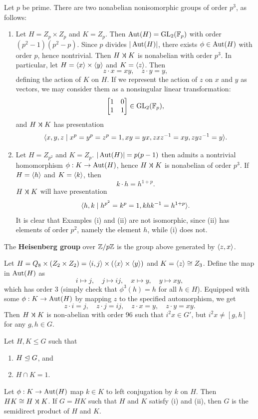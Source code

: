 \ex Let $p$ be prime. There are two nonabelian nonisomorphic groups of order $p^3$, as follows:
\begin{enumerate}
    \item Let $H = Z_p \times Z_p$ and $K = Z_p$. Then $\aut(H) = \gl_2(\f_p)$ with order $(p^2 - 1)(p^2- p)$. Since $p$ divides $|\aut(H)|$, there exists $\phi \in \aut(H)$ with order $p$, hence nontrivial. Then $H \semidir K$ is nonabelian with order $p^3$. In particular, let $H = \gen x \times \gen y$ and $K = \gen z$. Then
    \[z \cdot x = xy, \quad z \cdot y = y,\]
    defining the action of $K$ on $H$. If we represent the action of $z$ on $x$ and $y$ as vectors, we may consider them as a nonsingular linear transformation:
    \[
    \begin{bmatrix}
        1 & 0 \\
        1 & 1
    \end{bmatrix} \in \gl_2(\f_p),\]
    and $H \semidir K$ has presentation
    \[\gen{x, y, z \mid x^p = y^p = z^p = 1, xy = yx, zxz\inv = xy, zyz\inv = y}.\]
    \item Let $H = Z_{p^2}$ and $K = Z_p$. $|\aut(H)| = p(p - 1)$ then admits a nontrivial homomorphism $\phi : K \to \aut(H)$, hence $H \semidir K$ is nonabelian of order $p^3$. If $H = \gen h$ and $K = \gen k$, then
    \[k \cdot h = h^{1 + p}.\]
    $H \semidir K$ will have presentation
    \[\gen{h, k \mid h^{p^2} = k^p = 1, khk\inv = h^{1 + p}}.\]
    It is clear that Examples (i) and (ii) are not isomorphic, since (ii) has elements of order $p^2$, namely the element $h$, while (i) does not.
\end{enumerate}

 The \textbf{Heisenberg group} over $\intmod[p]$ is the group above generated by $\gen{z, x}$.

\ex Let $H = Q_8 \times (Z_2 \times Z_2) = \gen{i, j} \times (\gen x \times \gen y)$ and $K = \gen z \cong Z_3$. Define the map in $\aut(H)$ as
\[i \mapsto j, \quad j \mapsto ij, \quad x \mapsto y, \quad y \mapsto xy,\]
which has order 3 (simply check that $\phi^3(h) = h$ for all $h \in H$). Equipped with some $\phi : K \to \aut(H)$ by mapping $z$ to the specified automorphism, we get
\[z \cdot i = j, \quad z \cdot j = ij, \quad z \cdot x = y, \quad z \cdot y = xy.\]
Then $H \semidir K$ is non-abelian with order 96 such that $i^2x \in G'$, but $i^2x \neq [g, h]$ for any $g, h \in G$.

 \label{theo5.12}
Let $H, K \leq G$ such that
\begin{enumerate}
    \item $H \nsub G$, and
    \item $H \cap K = 1$.
\end{enumerate}
Let $\phi : K \to \aut(H)$ map $k \in K$ to left conjugation by $k$ on $H$. Then $HK \cong H \semidir K$. If $G = HK$ such that $H$ and $K$ satisfy (i) and (ii), then $G$ is the semidirect product of $H$ and $K$.

